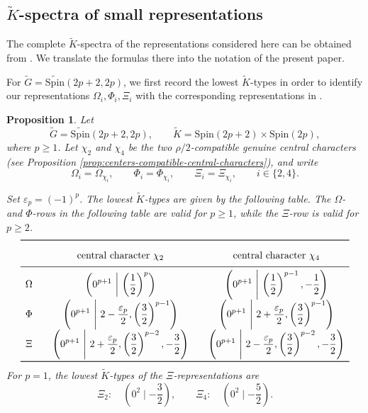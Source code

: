 \documentclass{amsart}
\newcommand{\Spin}{{\mathrm{Spin}}}
\newtheorem{prop}[thm]{Proposition}
\theoremstyle{definition}
\newcommand{\tu}{\widetilde}
\begin{document}
\subsection{\(\tu K\)-spectra of small representations}

The complete $\tu K$-spectra of the representations considered here
can be obtained from \cite[Theorem~4.1]{BTs18}.  We translate the
formulas there into the notation of the present paper.

For $\tu G=\tu{\Spin}(2p+2,2p)$, we first record the lowest
$\tu K$-types in order to identify our representations
$\Omega_i,\Phi_i,\Xi_i$ with the corresponding representations in
\cite[Theorem~4.1]{BTs18}.



\begin{prop}\label{p:lowest-K-types-even-even}
Let
\[
\tu G=\tu{\Spin}(2p+2,2p),
\qquad
\tu K=\Spin(2p+2)\times\Spin(2p),
\]
where \(p\geq 1\). Let \(\chi_2\) and \(\chi_4\) be the two $\rho/2$-compatible  genuine 
central characters (see Proposition \ref{prop:centers-compatible-central-characters}), and write
\[
\Omega_i=\Omega_{\chi_i},
\qquad
\Phi_i=\Phi_{\chi_i},
\qquad
\Xi_i=\Xi_{\chi_i},
\qquad i\in\{2,4\}.
\]


Set \(\varepsilon_p=(-1)^p\). 
The lowest
\(\tu K\)-types are given by the following table.  The \(\Omega\)- and \(\Phi\)-rows in the
following table are valid for \(p\geq1\), while the \(\Xi\)-row is valid
for \(p\geq2\). 
\[
\renewcommand{\arraystretch}{1.8}
\begin{array}{c@{\qquad}c@{\qquad}c}
\toprule
&
\text{central character }\chi_2
&
\text{central character }\chi_4
\\
\midrule
\Omega
&
\displaystyle
\left(
0^{p+1}
\ \middle|\
\left(\frac12\right)^p
\right)
&
\displaystyle
\left(
0^{p+1}
\ \middle|\
\left(\frac12\right)^{p-1},-\frac12
\right)
\\[2mm]
\Phi
&
\displaystyle
\left(
0^{p+1}
\ \middle|\
2-\frac{\varepsilon_p}{2},
\left(\frac32\right)^{p-1}
\right)
&
\displaystyle
\left(
0^{p+1}
\ \middle|\
2+\frac{\varepsilon_p}{2},
\left(\frac32\right)^{p-1}
\right)
\\[2mm]
\Xi
&
\displaystyle
\left(
0^{p+1}
\ \middle|\
2+\frac{\varepsilon_p}{2},
\left(\frac32\right)^{p-2},
-\frac32
\right)
&
\displaystyle
\left(
0^{p+1}
\ \middle|\
2-\frac{\varepsilon_p}{2},
\left(\frac32\right)^{p-2},
-\frac32
\right)
\\
\bottomrule
\end{array}
\]
For \(p=1\), the lowest \(\tu K\)-types of the \(\Xi\)-representations are
\[
\Xi_2:\quad
\left(0^2\mid-\frac32\right),
\qquad
\Xi_4:\quad
\left(0^2\mid-\frac52\right).
\]



\end{prop}
\end{document}
